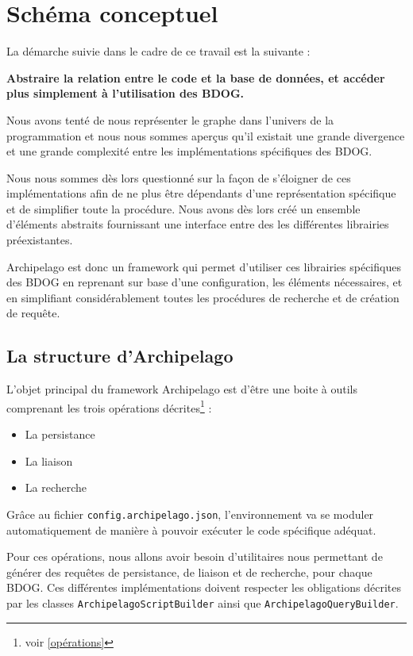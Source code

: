 \documentclass[a4paper,fleqn,12pt,oneside]{report}
\begin{document}
\section{Schéma conceptuel}

La démarche suivie dans le cadre de ce travail est la suivante :

\begin{center}
\textbf{Abstraire la relation entre le code et la base de données, et accéder plus simplement à l’utilisation des BDOG. }
\end{center} 

Nous avons tenté de nous représenter le graphe dans l'univers de la programmation et nous nous sommes aperçus qu'il existait une grande divergence et une grande complexité entre les implémentations spécifiques des BDOG.

Nous nous sommes dès lors questionné sur la façon de s'éloigner de ces implémentations afin de ne plus être dépendants d'une représentation spécifique et de simplifier toute la procédure. Nous avons dès lors créé un ensemble d'éléments abstraits fournissant une interface entre des les différentes librairies préexistantes.

Archipelago est donc un framework qui permet d'utiliser ces librairies spécifiques des BDOG en reprenant sur base d’une configuration, les éléments nécessaires, et en simplifiant considérablement toutes les procédures de recherche et de création de requête.
\subsection{La structure d'Archipelago}

L'objet principal du framework Archipelago est d'être une boite à outils comprenant les trois opérations décrites\footnote{voir \ref{opérations}} :
\begin{itemize}
\item La persistance
\item La liaison
\item La recherche
\end{itemize}

Grâce au fichier \texttt{config.archipelago.json}, l'environnement va se moduler automatiquement de manière à pouvoir exécuter le code spécifique adéquat.

Pour ces opérations, nous allons avoir besoin d'utilitaires nous permettant de générer des requêtes de persistance, de liaison et de recherche, pour chaque BDOG. Ces différentes implémentations doivent respecter les obligations décrites par les classes \texttt{ArchipelagoScriptBuilder} ainsi que \texttt{ArchipelagoQueryBuilder}.
\end{document}
